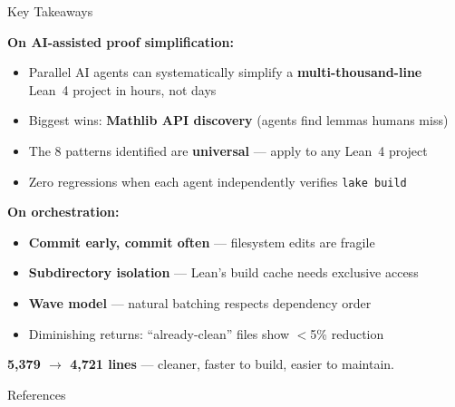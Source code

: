 \documentclass[aspectratio=169,10pt]{beamer}
\begin{document}
\begin{frame}{Key Takeaways}
    \vspace{-0.3em}

    \textbf{\textcolor{leangreen}{On AI-assisted proof simplification:}}
    \begin{itemize}\itemsep0.15em
        \item Parallel AI agents can systematically simplify a \textbf{multi-thousand-line}
              Lean~4 project in hours, not days
        \item Biggest wins: \textbf{Mathlib API discovery} (agents find lemmas humans miss)
        \item The 8 patterns identified are \textbf{universal} --- apply to any Lean~4 project
        \item Zero regressions when each agent independently verifies \texttt{lake build}
    \end{itemize}

    \vspace{0.3em}
    \textbf{\textcolor{amber}{On orchestration:}}
    \begin{itemize}\itemsep0.15em
        \item \textbf{Commit early, commit often} --- filesystem edits are fragile
        \item \textbf{Subdirectory isolation} --- Lean's build cache needs exclusive access
        \item \textbf{Wave model} --- natural batching respects dependency order
        \item Diminishing returns: ``already-clean'' files show $<$5\% reduction
    \end{itemize}

    \vspace{0.3em}
    \begin{center}
        {\large\textcolor{leangreen}{\textbf{5{,}379 $\to$ 4{,}721 lines} --- cleaner, faster to build, easier to maintain.}}
    \end{center}
\end{frame}

\begin{frame}[allowframebreaks]{References}
    
\end{frame}
\end{document}
